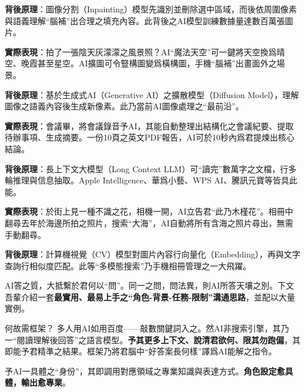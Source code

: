 \textbf{背後原理}：圖像分割（Inpainting）模型先識別並刪除選中區域，而後依周圍像素與語義理解“腦補”出合理之填充內容。此背後之AI模型訓練數據量達數百萬張圖片。


\textbf{實際表現}：拍了一張陰天灰濛濛之風景照？AI“魔法天空”可一鍵將天空換爲晴空、晚霞甚至星空。AI擴圖可令豎構圖變爲橫構圖，手機“腦補”出畫面外之場景。

\textbf{背後原理}：基於生成式AI（Generative AI）之擴散模型（Diffusion Model），理解圖像之語義內容後生成新像素。此乃當前AI圖像處理之“最前沿”。


\textbf{實際表現}：會議畢，將會議錄音予AI，其能自動整理出結構化之會議紀要、提取待辦事項、生成摘要。一份10頁之英文PDF報告，AI可於10秒內爲君提煉出核心結論。

\textbf{背後原理}：長上下文大模型（Long Context LLM）可“讀完”數萬字之文檔，行多輪推理與信息抽取。Apple Intelligence、華爲小藝、WPS AI、騰訊元寶等皆具此能。


\textbf{實際表現}：於街上見一種不識之花，相機一開，AI立告君“此乃木槿花”。相冊中翻尋去年於海邊所拍之照片，搜索“大海”，AI自動將所有含海之照片尋出，無需手動翻尋。

\textbf{背後原理}：計算機視覺（CV）模型對圖片內容行向量化（Embedding），再與文字查詢行相似度匹配。此等“多模態搜索”乃手機相冊管理之一大飛躍。


AI答之質，大抵繫於君何以“問”。同一之問，問法異，則AI所答天壤之別。下文吾輩介紹一套\textbf{最實用、最易上手之“角色-背景-任務-限制”溝通思路}，並配以大量實例。

\begin{tcbinfo}{何故需框架？}
多人用AI如用百度——敲數關鍵詞入之。然AI非搜索引擎，其乃一“閱讀理解後回答”之語言模型。\textbf{予其更多上下文、說清君欲何、限其勿跑偏}，其即能予君精準之結果。框架乃將君腦中“好答案長何樣”譯爲AI能解之指令。

\end{tcbinfo}


予AI一具體之“身份”，其即調用對應領域之專業知識與表達方式。\textbf{角色設定愈具體，輸出愈專業}。


